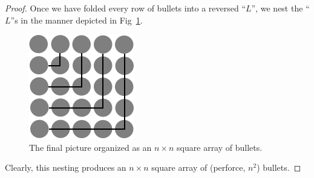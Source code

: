 \begin{proof}
Once we have folded every row of bullets into a reversed ``$L$'', we nest
the ``$L$''s in the manner depicted in Fig~\ref{fig:sumOdds3}.
\begin{figure}[ht]
\begin{center}
       \includegraphics[scale=0.4]{FiguresMaths/SumOddsFinal}
\caption{The final picture organized as an $n \times n$ square
  array of bullets.}
       \label{fig:sumOdds3}
\end{center}
\end{figure}
Clearly, this nesting produces an $n \times n$ square array of
(perforce, $n^2$) bullets.
\end{proof}


